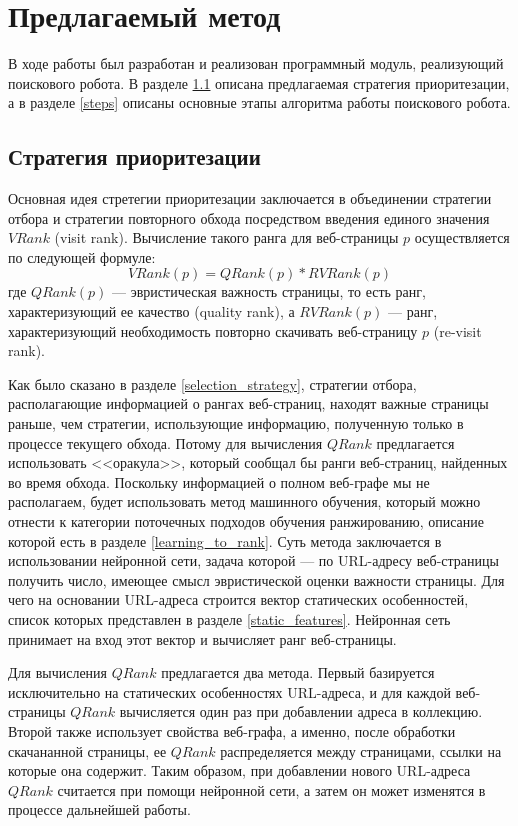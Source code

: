 \chapter{Предлагаемый метод}
\label{chapter_method}

В ходе работы был разработан и реализован программный модуль, реализующий поискового робота. В разделе \ref{strategy} описана предлагаемая стратегия приоритезации, а в разделе \ref{steps} описаны основные этапы алгоритма работы поискового робота.

\section{Стратегия приоритезации}
\label{strategy}

Основная идея стретегии приоритезации заключается в объединении стратегии отбора и стратегии повторного обхода посредством введения единого значения $VRank$ (visit rank). Вычисление такого ранга для веб-страницы $p$ осуществляется по следующей формуле:
$$VRank(p) = QRank(p) * RVRank(p)$$
где $QRank(p)$ --- эвристическая важность страницы, то есть ранг, характеризующий ее качество (quality rank), а $RVRank(p)$ --- ранг, характеризующий необходимость повторно скачивать веб-страницу $p$ (re-visit rank). 

Как было сказано в разделе \ref{selection_strategy}, стратегии отбора, располагающие информацией о рангах веб-страниц, находят важные страницы раньше, чем стратегии, использующие информацию, полученную только в процессе текущего обхода. Потому для вычисления $QRank$ предлагается использовать <<оракула>>, который сообщал бы ранги веб-страниц, найденных во время обхода. Поскольку информацией о полном веб-графе мы не располагаем, будет использовать метод машинного обучения, который можно отнести к категории поточечных подходов обучения ранжированию, описание которой есть в разделе \ref{learning_to_rank}. Суть метода заключается в использовании нейронной сети, задача которой --- по URL-адресу веб-страницы получить число, имеющее смысл эвристической оценки важности страницы. Для чего на основании URL-адреса строится вектор статических особенностей, список которых представлен в разделе \ref{static_features}. Нейронная сеть принимает на вход этот вектор и вычисляет ранг веб-страницы.

Для вычисления $QRank$ предлагается два метода. Первый базируется исключительно на статических особенностях URL-адреса, и для каждой веб-страницы $QRank$ вычисляется один раз при добавлении адреса в коллекцию. Второй также использует свойства веб-графа, а именно, после обработки скачананной страницы, ее $QRank$ распределяется между страницами, ссылки на которые она содержит. Таким образом, при добавлении нового URL-адреса $QRank$ считается при помощи нейронной сети, а затем он может изменятся в процессе дальнейшей работы.


